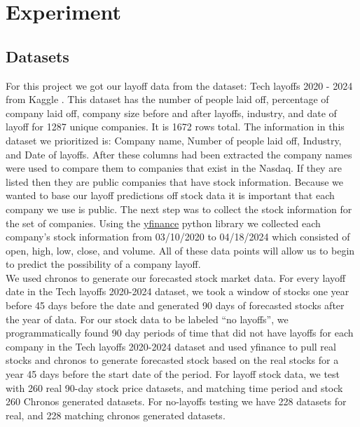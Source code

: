 \documentclass[10pt]{article}
\begin{document}
%
% 

\section{Experiment}
\subsection{Datasets}
For this project we got our layoff data from the dataset: Tech layoffs 
2020 - 2024 from Kaggle \cite{layoff-dataset}. This dataset has the 
number of people laid off, percentage of company laid off, company 
size before and after layoffs, industry, and date of layoff for 1287 
unique companies. It is 1672 rows total. The information in this
dataset we prioritized is: Company name, Number of people laid off, 
Industry, and Date of layoffs. After these columns had been extracted 
the company names were used to compare them to companies that exist 
in the Nasdaq. If they are listed then they are public companies that 
have stock information. Because we wanted to base our layoff 
predictions off stock data it is important that each company we use 
is public. The next step was to collect the stock information for the 
set of companies. Using the \href{https://pypi.org/project/yfinance/}{yfinance} python library we collected each 
company's stock information from 03/10/2020 to 04/18/2024 which 
consisted of open, high, low, close, and volume. All of these data 
points will allow us to begin to predict the possibility of a company 
layoff. 
\\
We used chronos to generate our forecasted stock market data. For 
every layoff date in the Tech layoffs 2020-2024 dataset, we took a 
window of stocks one year before 45 days before the date and generated 
90 days of forecasted stocks after the year of data. For our stock 
data to be labeled “no layoffs”, we programmatically found 90 day 
periods of time that did not have layoffs for each company in the 
Tech layoffs 2020-2024 dataset and used yfinance to pull real stocks 
and chronos to generate forecasted stock based on the real stocks 
for a year 45 days before the start date of the period. For layoff 
stock data, we test with 260 real 90-day stock price datasets, and 
matching time period and stock 260 Chronos generated datasets. For 
no-layoffs testing we have 228 datasets for real, and 228 matching 
chronos generated datasets.
\end{document}
